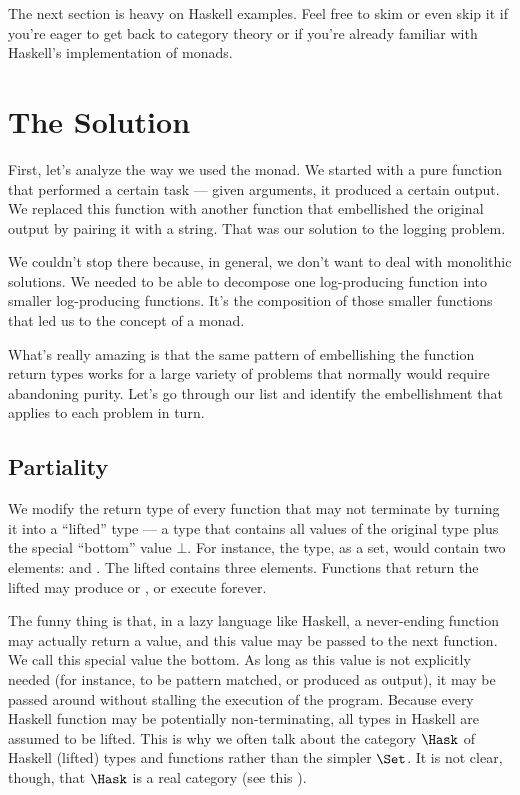 The next section is heavy on Haskell examples. Feel free to skim or even
skip it if you're eager to get back to category theory or if you're
already familiar with Haskell's implementation of monads.

\section{The Solution}

First, let's analyze the way we used the  monad. We
started with a pure function that performed a certain task --- given
arguments, it produced a certain output. We replaced this function with
another function that embellished the original output by pairing it with
a string. That was our solution to the logging problem.

We couldn't stop there because, in general, we don't want to deal with
monolithic solutions. We needed to be able to decompose one
log-producing function into smaller log-producing functions. It's the
composition of those smaller functions that led us to the concept of a
monad.

What's really amazing is that the same pattern of embellishing the
function return types works for a large variety of problems that
normally would require abandoning purity. Let's go through our list and
identify the embellishment that applies to each problem in turn.

\subsection{Partiality}

We modify the return type of every function that may not terminate by
turning it into a ``lifted'' type --- a type that contains all values of
the original type plus the special ``bottom'' value $\bot$. For
instance, the  type, as a set, would contain two elements:
 and . The lifted  contains
three elements. Functions that return the lifted  may
produce  or , or execute forever.

The funny thing is that, in a lazy language like Haskell, a never-ending
function may actually return a value, and this value may be passed to
the next function. We call this special value the bottom. As long as
this value is not explicitly needed (for instance, to be pattern
matched, or produced as output), it may be passed around without
stalling the execution of the program. Because every Haskell function
may be potentially non-terminating, all types in Haskell are assumed to
be lifted. This is why we often talk about the category $\Hask$ of
Haskell (lifted) types and functions rather than the simpler
$\Set$. It is not clear, though, that $\Hask$ is a real
category (see this
).

